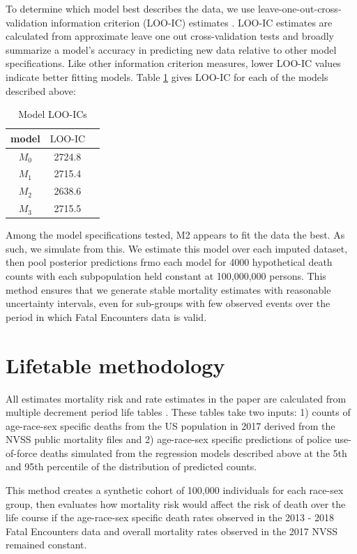 \documentclass[9pt,twoside,lineno]{pnas-new}
\begin{document}
To determine which model best describes the data, we use leave-one-out-cross-validation information criterion (LOO-IC) estimates \cite{vehtari2016bayesian}. LOO-IC estimates are calculated from approximate leave one out cross-validation tests and broadly summarize a model's accuracy in predicting new data relative to other model specifications. Like other information criterion measures, lower LOO-IC values indicate better fitting models. Table \ref{tab:a1} gives LOO-IC for each of the models described above: 

\begin{table}[H]
\center
  \begin{tabular}{ccc}
    model & $\text{LOO-IC}$ \\ 
  \hline
    $M_0$ & 2724.8 \\ 
    $M_1$ & 2715.4 \\
    $M_2$ & 2638.6 \\
    $M_3$ & 2715.5 \\
  \hline
  \end{tabular}
  \caption{Model LOO-ICs}
  \label{tab:a1}
\end{table}

Among the model specifications tested, M2 appears to fit the data the best. As such, we simulate from this. We estimate this model over each imputed dataset, then pool posterior predictions frmo each model for 4000 hypothetical death counts with each subpopulation held constant at 100,000,000 persons. This method ensures that we generate stable mortality estimates with reasonable uncertainty intervals, even for sub-groups with few observed events over the period in which Fatal Encounters data is valid. 

\section*{Lifetable methodology}

All estimates mortality risk and rate estimates in the paper are calculated from multiple decrement period life tables \cite{preston_demography:_2000}. These tables take two inputs: 1) counts of age-race-sex specific deaths from the US population in 2017 derived from the NVSS public mortality files and 2) age-race-sex specific predictions of police use-of-force deaths simulated from the regression models described above at the 5th and 95th percentile of the distribution of predicted counts.  

This method creates a synthetic cohort of 100,000 individuals for each race-sex group, then evaluates how mortality risk would affect the risk of death over the life course if the age-race-sex specific death rates observed in the 2013 - 2018 Fatal Encounters data and overall mortality rates observed in the 2017 NVSS remained constant. 
\end{document}
